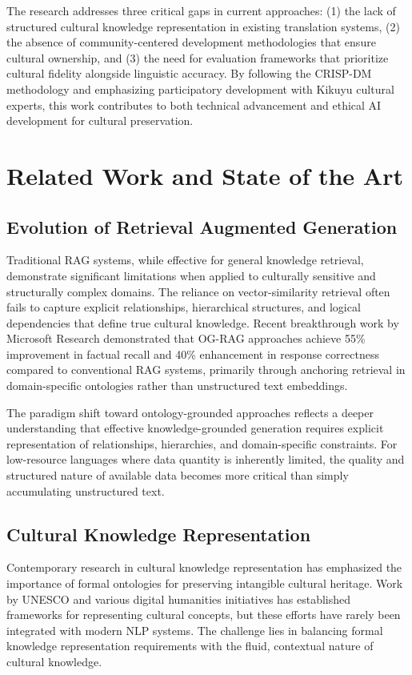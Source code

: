 \documentclass[
]{ceurart}
\begin{document}
The research addresses three critical gaps in current approaches: (1) the lack of structured cultural knowledge representation in existing translation systems, (2) the absence of community-centered development methodologies that ensure cultural ownership, and (3) the need for evaluation frameworks that prioritize cultural fidelity alongside linguistic accuracy. By following the CRISP-DM methodology and emphasizing participatory development with Kikuyu cultural experts, this work contributes to both technical advancement and ethical AI development for cultural preservation.

\section{Related Work and State of the Art}

\subsection{Evolution of Retrieval Augmented Generation}

Traditional RAG systems, while effective for general knowledge retrieval, demonstrate significant limitations when applied to culturally sensitive and structurally complex domains. The reliance on vector-similarity retrieval often fails to capture explicit relationships, hierarchical structures, and logical dependencies that define true cultural knowledge. Recent breakthrough work by Microsoft Research demonstrated that OG-RAG approaches achieve 55\% improvement in factual recall and 40\% enhancement in response correctness compared to conventional RAG systems, primarily through anchoring retrieval in domain-specific ontologies rather than unstructured text embeddings.

The paradigm shift toward ontology-grounded approaches reflects a deeper understanding that effective knowledge-grounded generation requires explicit representation of relationships, hierarchies, and domain-specific constraints. For low-resource languages where data quantity is inherently limited, the quality and structured nature of available data becomes more critical than simply accumulating unstructured text.

\subsection{Cultural Knowledge Representation}

Contemporary research in cultural knowledge representation has emphasized the importance of formal ontologies for preserving intangible cultural heritage. Work by UNESCO and various digital humanities initiatives has established frameworks for representing cultural concepts, but these efforts have rarely been integrated with modern NLP systems. The challenge lies in balancing formal knowledge representation requirements with the fluid, contextual nature of cultural knowledge.
\end{document}
